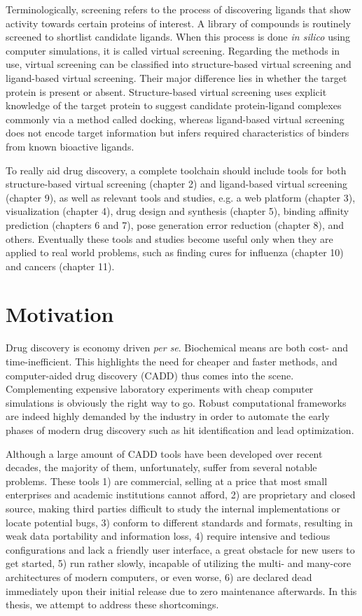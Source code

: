 Terminologically, screening refers to the process of discovering ligands that show activity towards certain proteins of interest. A library of compounds is routinely screened to shortlist candidate ligands. When this process is done \textit{in silico} using computer simulations, it is called virtual screening. Regarding the methods in use, virtual screening can be classified into structure-based virtual screening and ligand-based virtual screening. Their major difference lies in whether the target protein is present or absent. Structure-based virtual screening uses explicit knowledge of the target protein to suggest candidate protein-ligand complexes commonly via a method called docking, whereas ligand-based virtual screening does not encode target information but infers required characteristics of binders from known bioactive ligands.

To really aid drug discovery, a complete toolchain should include tools for both structure-based virtual screening (chapter 2) and ligand-based virtual screening (chapter 9), as well as relevant tools and studies, e.g. a web platform (chapter 3), visualization (chapter 4), drug design and synthesis (chapter 5), binding affinity prediction (chapters 6 and 7), pose generation error reduction (chapter 8), and others. Eventually these tools and studies become useful only when they are applied to real world problems, such as finding cures for influenza (chapter 10) and cancers (chapter 11).

\section{Motivation}

Drug discovery is economy driven \textit{per se}. Biochemical means are both cost- and time-inefficient. This highlights the need for cheaper and faster methods, and computer-aided drug discovery (CADD) thus comes into the scene. Complementing expensive laboratory experiments with cheap computer simulations is obviously the right way to go. Robust computational frameworks are indeed highly demanded by the industry in order to automate the early phases of modern drug discovery such as hit identification and lead optimization.

Although a large amount of CADD tools have been developed over recent decades, the majority of them, unfortunately, suffer from several notable problems. These tools 1) are commercial, selling at a price that most small enterprises and academic institutions cannot afford, 2) are proprietary and closed source, making third parties difficult to study the internal implementations or locate potential bugs, 3) conform to different standards and formats, resulting in weak data portability and information loss, 4) require intensive and tedious configurations and lack a friendly user interface, a great obstacle for new users to get started, 5) run rather slowly, incapable of utilizing the multi- and many-core architectures of modern computers, or even worse, 6) are declared dead immediately upon their initial release due to zero maintenance afterwards. In this thesis, we attempt to address these shortcomings.

